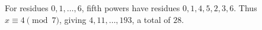 For residues $0,1,\ldots,6$, fifth powers have residues $0,1,4,5,2,3,6$. Thus $x\equiv4\pmod7$, giving $4,11,\ldots,193$, a total of $\boxed{28}$.
